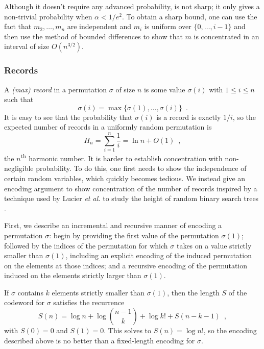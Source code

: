 \documentclass{patmorin}
\begin{document}
\begin{rem}
  Although it doesn't require any advanced probability,
   is not sharp; it only gives a non-trivial
  probability when $\alpha < 1/e^2$.  To obtain a sharp bound, one can
  use the fact that $m_2,\ldots,m_n$ are independent and $m_i$ is
  uniform over $\{0,\ldots,i-1\}$ and then use the method of bounded
  differences \cite{mcdiarmid:on} to show that $m$ is concentrated in
  an interval of size $O(n^{3/2})$.
\end{rem}

\subsubsection{Records}

A \emph{(max) record} in a permutation $\sigma$ of size $n$ is some
value $\sigma(i)$ with $1 \leq i \leq n$ such that
\[
  \sigma(i) = \max\{\sigma(1), \ldots, \sigma(i)\} \enspace .
\]
It is easy to see that the probability that $\sigma(i)$ is a record is
exactly $1/i$, so the expected number of records in a uniformly random
permutation is
\[
  H_n = \sum_{i = 1}^n \frac{1}{i} = \ln n + O(1) \enspace ,
\]
the $n$\textsuperscript{th} harmonic number. It is harder to establish
concentration with non-negligible probability. To do this, one first
needs to show the independence of certain random variables, which
quickly becomes tedious. We instead give an encoding argument to show
concentration of the number of records inspired by a technique used by
Lucier \emph{et al.} to study the height of random binary search trees
\cite{lucier.jiang.li:quicksort}.

First, we describe an incremental and recursive manner of encoding a
permutation $\sigma$: begin by providing the first value of the
permutation $\sigma(1)$; followed by the indices of the permutation
for which $\sigma$ takes on a value strictly smaller than $\sigma(1)$,
including an explicit encoding of the induced permutation on the
elements at those indices; and a recursive encoding of the permutation
induced on the elements strictly larger than $\sigma(1)$.

If $\sigma$ contains $k$ elements strictly smaller than $\sigma(1)$,
then the length $S$ of the codeword for $\sigma$ satisfies the
recurrence
\[
  S(n) = \log n + \log \binom{n - 1}{k} + \log k! + S(n - k - 1) \enspace ,
\]
with $S(0) = 0$ and $S(1) = 0$. This solves to $S(n) = \log n!$, so the
encoding described above is no better than a fixed-length encoding for
$\sigma$.
\end{document}
